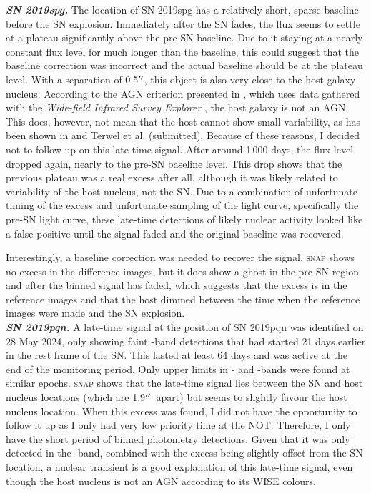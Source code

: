 \documentclass[a4paper,oneside,12pt, class=Latex/Classes/PhDthesisPSnPDF, crop=false]{standalone}
\begin{document}
\textit{\textbf{SN 2019spg.}}
The location of SN 2019spg has a relatively short, sparse baseline before the SN explosion. Immediately after the SN fades, the flux seems to settle at a plateau significantly above the pre-SN baseline. Due to it staying at a nearly constant flux level for much longer than the baseline, this could suggest that the baseline correction was incorrect and the actual baseline should be at the plateau level. With a separation of 0.5$^{\prime\prime}$, this object is also very close to the host galaxy nucleus. According to the AGN criterion presented in \citet{WISE_crit}, which uses data gathered with the \textit{Wide-field Infrared Survey Explorer} \citep[WISE,][]{WISE}, the host galaxy is not an AGN. This does, however, not mean that the host cannot show small variability, as has been shown in \citet{Terwel_2024_paper1} and Terwel et al. (submitted). Because of these reasons, I decided not to follow up on this late-time signal. After around 1\,000 days, the flux level dropped again, nearly to the pre-SN baseline level. This drop shows that the previous plateau was a real excess after all, although it was likely related to variability of the host nucleus, not the SN. Due to a combination of unfortunate timing of the excess and unfortunate sampling of the light curve, specifically the pre-SN light curve, these late-time detections of likely nuclear activity looked like a false positive until the signal faded and the original baseline was recovered.

Interestingly, a baseline correction was needed to recover the signal. \textsc{snap} shows no excess in the difference images, but it does show a ghost in the pre-SN region and after the binned signal has faded, which suggests that the excess is in the reference images and that the host dimmed between the time when the reference images were made and the SN explosion.\\


\textit{\textbf{SN 2019pqn.}}
A late-time signal at the position of SN 2019pqn was identified on 28 May 2024, only showing faint \ztfg-band detections that had started 21 days earlier in the rest frame of the SN. This lasted at least 64 days and was active at the end of the monitoring period. Only upper limits in \ztfr- and \ztfi-bands were found at similar epochs. \textsc{snap} shows that the late-time signal lies between the SN and host nucleus locations (which are 1.9$^{\prime\prime}$\ apart) but seems to slightly favour the host nucleus location. When this excess was found, I did not have the opportunity to follow it up as I only had very low priority time at the NOT. Therefore, I only have the short period of binned photometry detections. Given that it was only detected in the \ztfg-band, combined with the excess being slightly offset from the SN location, a nuclear transient is a good explanation of this late-time signal, even though the host nucleus is not an AGN according to its WISE colours.
\end{document}
